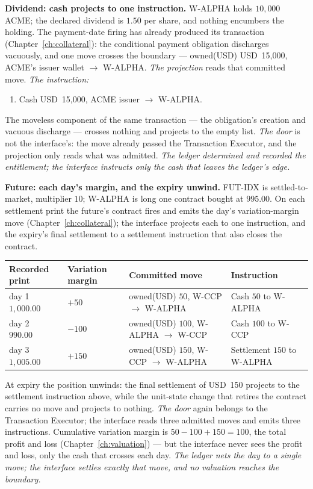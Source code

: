 \documentclass[11pt,a4paper]{article}
\newcommand{\USD}[1]{\mbox{USD~#1}}
\begin{document}
\textbf{Dividend: cash projects to one instruction.} W-ALPHA holds $10{,}000$ ACME;
the declared dividend is $1.50$ per share, and nothing encumbers the holding. The
payment-date firing has already produced its transaction
(Chapter~\ref{ch:collateral}): the conditional payment obligation discharges
vacuously, and one move crosses the boundary --- owned(USD) \USD{15{,}000}, ACME's
issuer wallet $\to$ W-ALPHA.
\emph{The projection} reads that committed move.
\emph{The instruction:}
\begin{enumerate}[label=(\arabic*),nosep]
\item Cash \USD{15{,}000}, ACME issuer $\to$ W-ALPHA.
\end{enumerate}
The moveless component of the same transaction --- the obligation's creation and
vacuous discharge --- crosses nothing and projects to the empty list.
\emph{The door} is not the interface's: the move already passed the Transaction
Executor, and the projection only reads what was admitted.
\emph{The ledger determined and recorded the entitlement; the interface instructs
only the cash that leaves the ledger's edge.}

\medskip\noindent\textbf{Future: each day's margin, and the expiry unwind.} FUT-IDX
is settled-to-market, multiplier $10$; W-ALPHA is long one contract bought at
$995.00$. On each settlement print the future's contract fires and emits the day's
variation-margin move (Chapter~\ref{ch:collateral}); the interface projects each to
one instruction, and the expiry's final settlement to a settlement instruction that
also closes the contract.

\begin{center}
\begin{tabular}{@{}llll@{}}
\toprule
Recorded print & Variation margin & Committed move & Instruction \\
\midrule
day 1 \ $1{,}000.00$ & $+50$ & owned(USD) $50$, W-CCP $\to$ W-ALPHA & Cash $50$ to W-ALPHA \\
day 2 \ $990.00$ & $-100$ & owned(USD) $100$, W-ALPHA $\to$ W-CCP & Cash $100$ to W-CCP \\
day 3 \ $1{,}005.00$ & $+150$ & owned(USD) $150$, W-CCP $\to$ W-ALPHA & Settlement $150$ to W-ALPHA \\
\bottomrule
\end{tabular}
\end{center}

\noindent At expiry the position unwinds: the final settlement of \USD{150}
projects to the settlement instruction above, while the unit-state change that
retires the contract carries no move and projects to nothing.
\emph{The door} again belongs to the Transaction Executor; the interface reads
three admitted moves and emits three instructions.
Cumulative variation margin is $50-100+150 = 100$, the total profit and loss
(Chapter~\ref{ch:valuation}) --- but the interface never sees the profit and loss,
only the cash that crosses each day.
\emph{The ledger nets the day to a single move; the interface settles exactly that
move, and no valuation reaches the boundary.}
\end{document}
